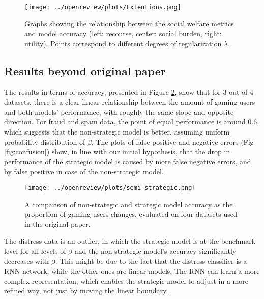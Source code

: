 \begin{figure}
    \centering
    \hspace*{-.5in}
    \texttt{[image: ../openreview/plots/Extentions.png]}
    \caption{Graphs showing the relationship between the social welfare metrics and model accuracy (left: recourse, center: social burden, right: utility). Points correspond 
    to different degrees of regularization $\lambda$. }
    \label{fig:extention_results}
\end{figure}


\subsection{Results beyond original paper}

The results in terms of accuracy, presented in Figure \ref{fig:semi-strat}, show that for 3 out of 4 datasets, there is a clear linear relationship between the amount of gaming users and both models' performance, with roughly the same slope and opposite direction. For fraud and spam data, the point of equal performance is around 0.6, which suggests that the non-strategic model is better, assuming uniform probability distribution of $\beta$. The plots of false positive and negative errors (Fig \ref{fig:confusion}) show, in line with our initial hypothesis, that the drop in performance of the strategic model is caused by more false negative errors, and by false positive in case of the non-strategic model.

\begin{figure}[H]
    \centering
    \texttt{[image: ../openreview/plots/semi-strategic.png]}
    \caption{A comparison of non-strategic and strategic model accuracy as the proportion of gaming  users changes, evaluated on four datasets used in the original paper. }
    \label{fig:semi-strat}
\end{figure}

The distress data is an outlier, in which the strategic model is at the benchmark level for all levels of $\beta$ and the non-strategic model's accuracy significantly decreases with $\beta$. This might be due to the fact that the distress classifier is a RNN network, while the other ones are linear models. The RNN can learn a more complex representation, which enables the strategic model to adjust in a more refined way, not just by moving the linear boundary. 

